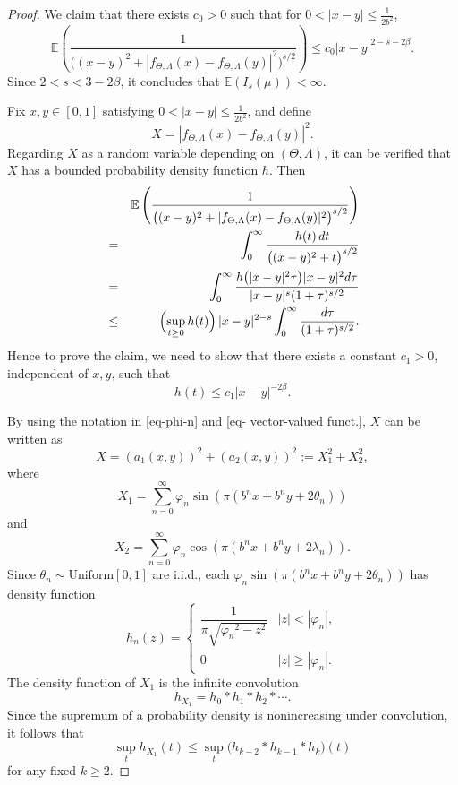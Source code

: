 \documentclass[10pt,a4paper]{amsart}
\begin{document}
\begin{proof}
	We claim that there exists $c_0>0$ such that for \( 0 < |x-y| \le \frac{1}{2b^2} \),  
	$$\mathbb{E}\left(\frac{1}{\bigl((x-y)^2 + |f_{\Theta,\Lambda}(x)-f_{\Theta,\Lambda}(y)|^2\bigr)^{s/2}}\right)\le c_0|x-y|^{2-s-2\beta}.$$
	Since \( 2 < s < 3-2\beta \), it concludes that $\mathbb{E}(I_s(\mu))<\infty$.
	
	Fix \( x,y \in [0,1] \) satisfying \( 0 < |x-y| \le \frac{1}{2b^2}\), and define
	$$X = |f_{\Theta,\Lambda}(x)-f_{\Theta,\Lambda}(y)|^2.$$
	Regarding \( X \) as a random variable depending on \( (\Theta,\Lambda) \), it can be verified that \( X \) has a bounded probability density function \( h \). Then
	\begin{eqnarray*}
			&& \mathbb{E}\left(\frac{1}{\bigl((x-y)^2 + |f_{\Theta,\Lambda}(x)-f_{\Theta,\Lambda}(y)|^2\bigr)^{s/2}}\right) \\
			&= &\int_0^\infty \frac{h(t)\,dt}{\bigl((x-y)^2 + t\bigr)^{s/2}} \\
			&= &\int_0^\infty \frac{h\bigl(|x-y|^2 \tau\bigr) |x-y|^2 d\tau}{|x-y|^s (1+\tau)^{s/2}} \\
			&\le &\Bigl(\sup_{t\ge 0} h(t)\Bigr) \, |x-y|^{2-s} \int_0^\infty \frac{d\tau}{(1+\tau)^{s/2}}.
	\end{eqnarray*}
	 Hence to prove the claim, we need to show that there exists a constant \( c_1>0 \), independent of \( x,y \), such that
	\begin{equation}\label{eq-claim}
	h(t) \le c_1|x-y|^{-2\beta}.
	\end{equation}
	
	By using the notation in \eqref{eq-phi-n} and \eqref{eq- vector-valued funct.}, $X$ can be written as
	$$X = (a_1(x,y))^2 +(a_2(x,y))^2 := X_1^2 + X_2^2,$$
	where    
	   $$X_1 = \sum_{n=0}^\infty  \varphi_n \sin\left(\pi\left(b^n x + b^n y +2\theta_n\right)\right)$$ 
	and 
	   $$X_2 = \sum_{n=0}^\infty  \varphi_n \cos\left(\pi\left(b^n x + b^n y +2\lambda_n\right)\right).$$
   Since \( \theta_n \sim \mathrm{Uniform}[0,1] \) are i.i.d., each \( \varphi_n \sin\left(\pi\left(b^n x + b^n y +2\theta_n\right)\right) \) has density function
	\begin{equation*}
		h_n(z) =
		\begin{cases}
			\dfrac{1}{\pi\sqrt{{\varphi_n}^2-z^2}} & |z| < |\varphi_n|, \\
			0 & |z| \ge |\varphi_n|.
		\end{cases}
	\end{equation*}
 The density function of $X_1$ is the infinite convolution 
 $$h_{X_1} = h_0 * h_1 * h_2 * \cdots.$$ 
 Since the supremum of a probability density is nonincreasing under convolution, it follows that	
	\[
	\sup_t h_{X_1}(t) \le \sup_t \bigl(h_{k-2} * h_{k-1} * h_k\bigr)(t)
	\]
	for any fixed \( k \ge 2 \). 
	

\end{proof}
\end{document}
